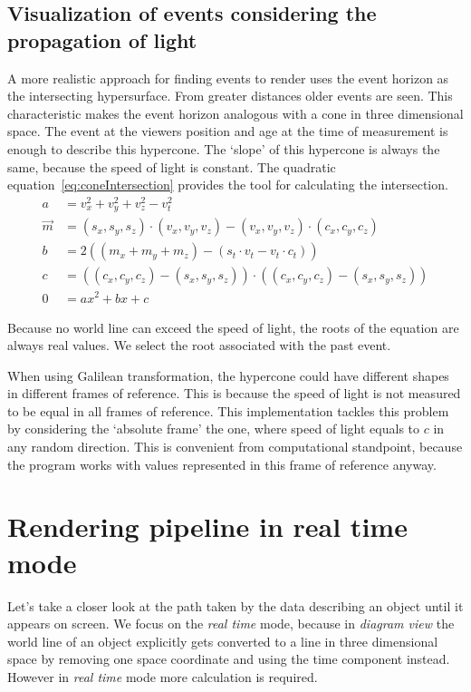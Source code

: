 \documentclass{egpubl}
\begin{document}
\subsection{Visualization of events considering the propagation of light}
\label{visConsLight}
A more realistic approach for finding events to render uses the event horizon as the intersecting hypersurface. From greater distances older events are seen. This characteristic makes the event horizon analogous with a cone in three dimensional space. The event at the viewers position and age at the time of measurement is enough to describe this hypercone. The  `slope' of this hypercone is always the same, because the speed of light is constant. The quadratic equation~\ref{eq:coneIntersection} provides the tool for calculating the intersection.
\begin{align}
a &= v_x^2 + v_y^2 + v_z^2 - v_t^2\\
\vec{m} &= (s_x, s_y, s_z)\cdot{}(v_x, v_y, v_z) - (v_x, v_y, v_z)\cdot{}(c_x, c_y, c_z)\\
b &= 2((m_x + m_y + m_z) - (s_t\cdot{}v_t - v_t\cdot{}c_t))\\
c &= ((c_x, c_y, c_z) - (s_x, s_y, s_z))\cdot{}((c_x, c_y, c_z) - (s_x, s_y, s_z))\\
0 &=ax^2 + bx + c
\label{eq:coneIntersection}
\end{align}

Because no world line can exceed the speed of light, the roots of the equation are always real values. We select the root associated with the past event. 

When using Galilean transformation, the hypercone could have different shapes in different frames of reference. This is because the speed of light is not measured to be equal in all frames of reference. This implementation tackles this problem by considering the `absolute frame' the one, where speed of light equals to $c$ in any random direction. This is convenient from computational standpoint, because the program works with values represented in this frame of reference anyway.

\section{Rendering pipeline in real time mode}
Let's take a closer look at the path taken by the data describing an object until it appears on screen. We focus on the \emph{real time} mode, because in \emph{diagram view} the world line of an object explicitly gets converted to a line in three dimensional space by removing one space coordinate and using the time component instead. However in \emph{real time} mode more calculation is required.
\end{document}
